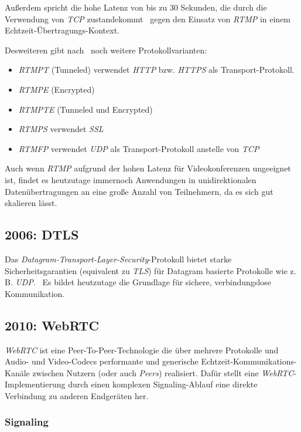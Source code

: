 \documentclass{article}
\begin{document}
\begin{onecolumn}
Außerdem spricht die hohe Latenz von bis zu 30 Sekunden, die durch die
Verwendung von \textit{TCP} zustandekommt~\cite{StreamingProtokolle} gegen den
Einsatz von \textit{RTMP} in einem Echtzeit-Übertragungs-Kontext.

Desweiteren gibt nach~\cite{RTMP} noch weitere Protokollvarianten:

\begin{itemize}
	\item \textit{RTMPT} (Tunneled) verwendet \textit{HTTP} bzw. \textit{HTTPS}
		als Transport-Protokoll.
	\item \textit{RTMPE} (Encrypted)
	\item \textit{RTMPTE} (Tunneled und Encrypted)
	\item \textit{RTMPS} verwendet \textit{SSL}
	\item \textit{RTMFP} verwendet \textit{UDP} als Transport-Protokoll
		anstelle von \textit{TCP}
\end{itemize}

Auch wenn \textit{RTMP} aufgrund der hohen Latenz für Videokonferenzen
ungeeignet ist, findet es heutzutage immernoch Anwendungen in
unidirektionalen Datenübertragungen an eine große Anzahl von Teilnehmern, da es
sich gut skalieren lässt.~\cite{RTMP}

\subsection{2006: DTLS}

Das \textit{Datagram-Transport-Layer-Security}-Protokoll bietet starke
Sicherheitsgarantien (equivalent zu \textit{TLS}) für Datagram basierte
Protokolle wie z. B. \textit{UDP}.~\cite{RFC4347} Es bildet heutzutage die
Grundlage für sichere, verbindungslose Kommunikation.

\subsection{2010: WebRTC}

\textit{WebRTC} ist eine Peer-To-Peer-Technologie die über mehrere Protokolle
und Audio- und Video-Codecs performante und generische
Echtzeit-Kommunikations-Kanäle zwischen Nutzern (oder auch \textit{Peers})
realisiert. Dafür stellt eine \textit{WebRTC}-Implementierung durch einen
komplexen Signaling-Ablauf eine direkte Verbindung zu anderen Endgeräten
her.~\cite{MDNSignaling}

\subsubsection{Signaling}


\end{onecolumn}
\end{document}
